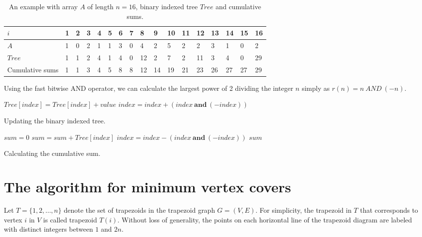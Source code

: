 \documentclass[11pt,letter]{article}
\begin{document}
\begin{table}[ht]
\centering \begin{tabular} {l|llllllllllllllll}
\toprule

$i$ & 1 &  2 &  3 &  4  & 5 &  6 &  7 &  8 &  9 &  10 & 11 & 12 & 13 & 14 & 15  & 16 \\
\midrule
$A$ &  1 &  0 &  2 &  1 &  1 &  3 &  0 &  4 &  2 & 5 &  2 &  2 &  3 &  1 &  0 &  2 \\
$Tree$ &  1 & 1 &  2 & 4 &  1 &  4 & 0 & 12 & 2 & 7 & 2 &  11 & 3 &  4 & 0 & 29\\
Cumulative sums &  1 &  1 &  3 &  4  & 5 &  8 &  8 &  12 & 14 & 19 & 21 & 23 & 26 & 27 & 27 & 29 \\
\bottomrule
\end{tabular}

\caption{An example with array $A$ of length $n = 16$, binary indexed tree $Tree$ and cumulative
sums.}
\end{table}




Using the fast bitwise AND operator, we can calculate the largest power of 2 dividing the integer
$n$ simply as $r (n) = n \ AND \ (-n)$.


\begin{algorithm}

    {
        $Tree [index] = Tree [index] + value$\;
        $index = index + (index \ \mathbf{and} \ (-index))$\;
    }
    \caption{ Updating the binary indexed tree. }
\end{algorithm}


\begin{algorithm}

    $sum = 0$\;
    {
        $sum = sum + Tree[index]$\;
        $index = index - (index \ \mathbf{and} \ (-index))$\;
    }
    \Return $sum$\;

    \caption{ Calculating the cumulative sum. }
\end{algorithm}



\section{The algorithm for minimum vertex covers}



Let $T = \{1, 2, \ldots, n\}$ denote the set of trapezoids in the trapezoid graph $G = (V, E)$. For
simplicity, the trapezoid in $T$ that corresponds to vertex $i$ in $V$ is called trapezoid $T (i)$.
Without loss of generality, the points on each horizontal line of the trapezoid diagram are labeled
with distinct integers between $1$ and $2n$.
\end{document}
